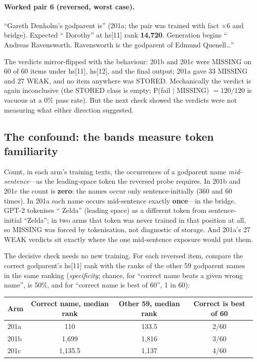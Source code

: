 \documentclass[11pt]{article}
\begin{document}
\paragraph{Worked pair 6 (reversed, worst case).}
``Gareth Denholm's godparent is'' (201a; the pair was trained with
fact $\times 6$ and bridge). Expected `` Dorothy'' at hs[11] rank
\textbf{14,720}. Generation begins `` Andreas Ravensworth.
Ravensworth is the godparent of Edmund Quenell\ldots''

The verdicts mirror-flipped with the behaviour: 201b and 201c were
MISSING on 60 of 60 items under hs[11], hs[12], and the final output;
201a gave 33 MISSING and 27 WEAK, and no item anywhere was STORED.
Mechanically the verdict is again inconclusive (the STORED class is
empty; P(fail $\mid$ MISSING) $= 120/120$ is vacuous at a 0\% pass
rate). But the next check showed the verdicts were not measuring what
either direction suggested.

\subsection{The confound: the bands measure token familiarity}

Count, in each arm's training texts, the occurrences of a godparent
name \emph{mid-sentence}---as the leading-space token the reversed
probe requires. In 201b and 201c the count is \textbf{zero}: the names
occur only sentence-initially (360 and 60 times). In 201a each name
occurs mid-sentence exactly \textbf{once}---in the bridge. GPT-2
tokenises `` Zelda'' (leading space) as a different token from
sentence-initial ``Zelda''; in two arms that token was never trained in
that position at all, so MISSING was forced by tokenisation, not
diagnostic of storage. And 201a's 27 WEAK verdicts sit exactly where
the one mid-sentence exposure would put them.

The decisive check needs no new training. For each reversed item,
compare the correct godparent's hs[11] rank with the ranks of the
other 59 godparent names in the same ranking (\emph{specificity};
chance, for ``correct name beats a given wrong name'', is 50\%, and
for ``correct name is best of 60'', 1 in 60):

\begin{center}
\begin{tabular}{lccc}
\toprule
Arm & Correct name, median rank & Other 59, median rank & Correct is best of 60 \\
\midrule
201a & 110 & 133.5 & 2/60 \\
201b & 1,699 & 1,816 & 3/60 \\
201c & 1,135.5 & 1,137 & 4/60 \\
\bottomrule
\end{tabular}
\end{center}
\end{document}
